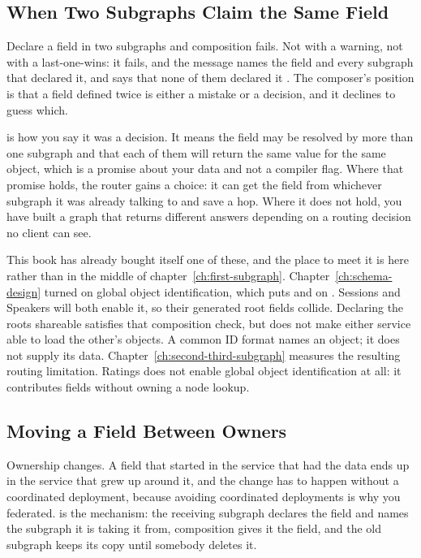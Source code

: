 \subsection{When Two Subgraphs Claim the Same Field}

%
Declare a field in two subgraphs and composition fails. Not with a warning, not
with a last-one-wins: it fails, and the message names the field and every
subgraph that declared it, and says that none of them declared it
. The composer's position is that a field defined twice is
either a mistake or a decision, and it declines to guess which.

%
 is how you say it was a decision. It means the field may be
resolved by more than one subgraph and that each of them will return the same
value for the same object, which is a promise about your data and not a
compiler flag. Where that promise holds, the router gains a choice: it can get
the field from whichever subgraph it was already talking to and save a hop.
Where it does not hold, you have built a graph that returns different answers
depending on a routing decision no client can see.

%
This book has already bought itself one of these, and the place to meet it is
here rather than in the middle of chapter~\ref{ch:first-subgraph}.
Chapter~\ref{ch:schema-design} turned on global object identification, which
puts  and  on . Sessions and Speakers
will both enable it, so their generated root fields collide. Declaring the
roots shareable satisfies that composition check, but does not make either
service able to load the other's objects. A common ID format names an object;
it does not supply its data. Chapter~\ref{ch:second-third-subgraph} measures
the resulting routing limitation. Ratings does not enable global object
identification at all: it contributes fields without owning a node lookup.

\subsection{Moving a Field Between Owners}

%
Ownership changes. A field that started in the service that had the data ends
up in the service that grew up around it, and the change has to happen without
a coordinated deployment, because avoiding coordinated deployments is why you
federated.  is the mechanism: the receiving subgraph
declares the field and names the subgraph it is taking it from, composition
gives it the field, and the old subgraph keeps its copy until somebody deletes
it.

